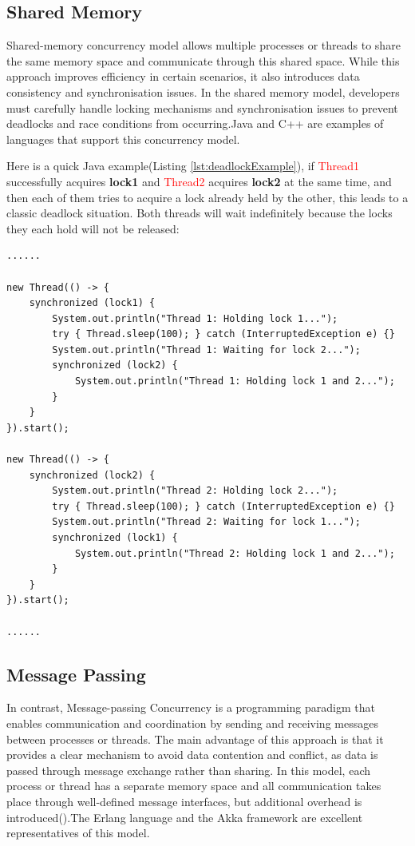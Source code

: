 \documentclass{l4proj}
\begin{document}
\subsection{Shared Memory}
Shared-memory concurrency model allows multiple processes or threads to share the same memory space and communicate through this shared space. While this approach improves efficiency in certain scenarios, it also introduces data consistency and synchronisation issues. In the shared memory model, developers must carefully handle locking mechanisms and synchronisation issues to prevent deadlocks and race conditions from occurring.Java and C++ are examples of languages that support this concurrency model.

Here is a quick Java example(Listing \ref{lst:deadlockExample}), if \textcolor{red}{Thread1} successfully acquires \textbf{lock1} and \textcolor{red}{Thread2} acquires \textbf{lock2} at the same time, and then each of them tries to acquire a lock already held by the other, this leads to a classic deadlock situation. Both threads will wait indefinitely because the locks they each hold will not be released:

\lstset{style=javastyle}
\begin{lstlisting}[caption={Java example demonstrating a potential deadlock}, label={lst:deadlockExample}]
......

new Thread(() -> {
    synchronized (lock1) {
        System.out.println("Thread 1: Holding lock 1...");
        try { Thread.sleep(100); } catch (InterruptedException e) {}
        System.out.println("Thread 1: Waiting for lock 2...");
        synchronized (lock2) {
            System.out.println("Thread 1: Holding lock 1 and 2...");
        }
    }
}).start();
        
new Thread(() -> {
    synchronized (lock2) {
        System.out.println("Thread 2: Holding lock 2...");
        try { Thread.sleep(100); } catch (InterruptedException e) {}
        System.out.println("Thread 2: Waiting for lock 1...");
        synchronized (lock1) {
            System.out.println("Thread 2: Holding lock 1 and 2...");
        }
    }
}).start();

......
\end{lstlisting}

\subsection{Message Passing}
In contrast, Message-passing Concurrency is a programming paradigm that enables communication and coordination by sending and receiving messages between processes or threads. The main advantage of this approach is that it provides a clear mechanism to avoid data contention and conflict, as data is passed through message exchange rather than sharing. In this model, each process or thread has a separate memory space and all communication takes place through well-defined message interfaces, but additional overhead is introduced(\cite{a2023_message}).The Erlang language and the Akka framework are excellent representatives of this model.
\end{document}
